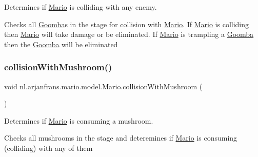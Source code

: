 Determines if \hyperlink{classnl_1_1arjanfrans_1_1mario_1_1model_1_1Mario}{Mario} is colliding with any enemy. 

Checks all \hyperlink{classnl_1_1arjanfrans_1_1mario_1_1model_1_1Goomba}{Goomba}\textquotesingle{}s in the stage for collision with \hyperlink{classnl_1_1arjanfrans_1_1mario_1_1model_1_1Mario}{Mario}. If \hyperlink{classnl_1_1arjanfrans_1_1mario_1_1model_1_1Mario}{Mario} is colliding then \hyperlink{classnl_1_1arjanfrans_1_1mario_1_1model_1_1Mario}{Mario} will take damage or be eliminated. If \hyperlink{classnl_1_1arjanfrans_1_1mario_1_1model_1_1Mario}{Mario} is trampling a \hyperlink{classnl_1_1arjanfrans_1_1mario_1_1model_1_1Goomba}{Goomba} then the \hyperlink{classnl_1_1arjanfrans_1_1mario_1_1model_1_1Goomba}{Goomba} will be eliminated \mbox{\label{classnl_1_1arjanfrans_1_1mario_1_1model_1_1Mario_a19d885fce354f45ae4419abd36cd795e}} 
\subsubsection{\texorpdfstring{collision\+With\+Mushroom()}{collisionWithMushroom()}}
{\footnotesize\ttfamily void nl.\+arjanfrans.\+mario.\+model.\+Mario.\+collision\+With\+Mushroom (\begin{DoxyParamCaption}{ }\end{DoxyParamCaption})\hspace{0.3cm}{\ttfamily [protected]}}



Determines if \hyperlink{classnl_1_1arjanfrans_1_1mario_1_1model_1_1Mario}{Mario} is consuming a mushroom. 

Checks all mushrooms in the stage and deteremines if \hyperlink{classnl_1_1arjanfrans_1_1mario_1_1model_1_1Mario}{Mario} is consuming (colliding) with any of them \mbox{\label{classnl_1_1arjanfrans_1_1mario_1_1model_1_1Mario_a8ec810c8c16e6f4151c1259fb96d1790}} 
